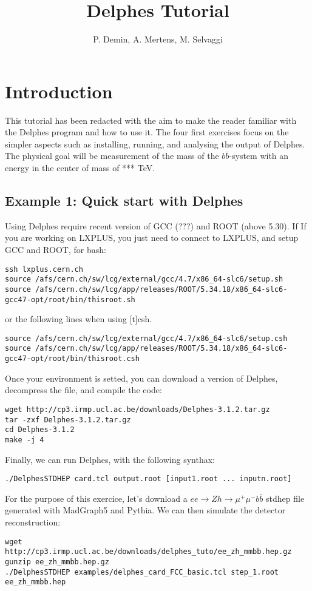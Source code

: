 \documentclass[a4paper,10pt]{article}
\title{Delphes Tutorial}
\author{P. Demin, A. Mertens, M. Selvaggi}
\begin{document}
\maketitle


\section{Introduction}

This tutorial has been redacted with the aim to make the reader familiar with the Delphes program and how to use it. 
The four first exercises focus on the simpler aspects such as installing, running, and analysing the output of Delphes. 
The physical goal will be measurement of the mass of the $b\bar{b}$-system with an energy in the center of mass of *** TeV.

\subsection{Example 1: Quick start with Delphes}

Using Delphes require recent version of GCC (???) and ROOT (above 5.30). If If you are working on LXPLUS, you just need to connect to LXPLUS, and setup GCC and ROOT, for bash:
\begin{lstlisting} 
ssh lxplus.cern.ch
source /afs/cern.ch/sw/lcg/external/gcc/4.7/x86_64-slc6/setup.sh
source /afs/cern.ch/sw/lcg/app/releases/ROOT/5.34.18/x86_64-slc6-gcc47-opt/root/bin/thisroot.sh
\end{lstlisting}
or the following lines when using [t]csh.
\begin{lstlisting}
source /afs/cern.ch/sw/lcg/external/gcc/4.7/x86_64-slc6/setup.csh
source /afs/cern.ch/sw/lcg/app/releases/ROOT/5.34.18/x86_64-slc6-gcc47-opt/root/bin/thisroot.csh
\end{lstlisting}
Once your environment is setted, you can download a version of Delphes, decompress the file, and compile the code:
\begin{lstlisting}
wget http://cp3.irmp.ucl.ac.be/downloads/Delphes-3.1.2.tar.gz
tar -zxf Delphes-3.1.2.tar.gz
cd Delphes-3.1.2
make -j 4
\end{lstlisting}

Finally, we can run Delphes, with the following synthax:
\begin{lstlisting}
./DelphesSTDHEP card.tcl output.root [input1.root ... inputn.root]
\end{lstlisting}

For the purpose of this exercice, let's download a $ee \rightarrow Z h \rightarrow \mu^+ \mu^- b \bar{b}$ stdhep file generated with MadGraph5 and Pythia. We can then simulate the detector reconstruction:
\begin{lstlisting}
wget http://cp3.irmp.ucl.ac.be/downloads/delphes_tuto/ee_zh_mmbb.hep.gz
gunzip ee_zh_mmbb.hep.gz
./DelphesSTDHEP examples/delphes_card_FCC_basic.tcl step_1.root ee_zh_mmbb.hep
\end{lstlisting}
\end{document}
